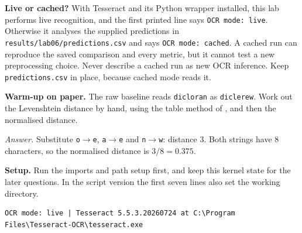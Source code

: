 \begin{pitfall}
\textbf{Live or cached?} With Tesseract and its Python wrapper installed, this lab performs live recognition, and the first printed line says \texttt{OCR mode: live}. Otherwise it analyses the supplied predictions in \texttt{results/lab06/predictions.csv} and says \texttt{OCR mode: cached}. A cached run can reproduce the saved comparison and every metric, but it cannot test a new preprocessing choice. Never describe a cached run as new OCR inference. Keep \texttt{predictions.csv} in place, because cached mode reads it.
\end{pitfall}



\labroutine

\begin{yourturn}
\textbf{Warm-up on paper.} The raw baseline reads \texttt{dicloran} as \texttt{diclerew}. Work out the Levenshtein distance by hand, using the table method of , and then the normalised distance.

\emph{Answer.} Substitute \texttt{o}$\to$\texttt{e}, \texttt{a}$\to$\texttt{e} and \texttt{n}$\to$\texttt{w}: distance 3. Both strings have 8 characters, so the normalised distance is $3/8=0.375$.
\end{yourturn}

\textbf{Setup.} Run the imports and path setup first, and keep this kernel state for the later questions. In the script version the first seven lines also set the working directory.


\begin{refoutput}
\begin{lstlisting}[style=utpterminal]
OCR mode: live | Tesseract 5.5.3.20260724 at C:\Program Files\Tesseract-OCR\tesseract.exe
\end{lstlisting}
\end{refoutput}

